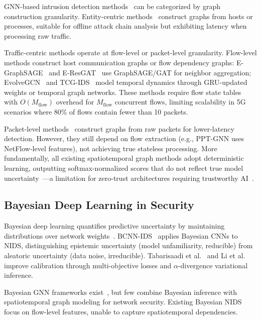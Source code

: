 \documentclass[lettersize,journal]{IEEEtran}
\begin{document}
GNN-based intrusion detection methods~\cite{Zhong_GNN_IDS_Survey_2024} can be categorized by graph construction granularity. Entity-centric methods~\cite{jiang2020gnn,kisanga2023graph,sun2024gnnids} construct graphs from hosts or processes, suitable for offline attack chain analysis but exhibiting latency when processing raw traffic.

Traffic-centric methods operate at flow-level or packet-level granularity. Flow-level methods construct host communication graphs or flow dependency graphs: E-GraphSAGE~\cite{lo2022egraphsage} and E-ResGAT~\cite{E-ResGAT} use GraphSAGE/GAT for neighbor aggregation; EvolveGCN~\cite{EvolveGCN} and TCG-IDS~\cite{TCG-IDS} model temporal dynamics through GRU-updated weights or temporal graph networks. These methods require flow state tables with $O(M_{\text{flow}})$ overhead for $M_{\text{flow}}$ concurrent flows, limiting scalability in 5G scenarios where 80\% of flows contain fewer than 10 packets.

Packet-level methods~\cite{Graph2vec+RF,GTAE-IDS,PPT-GNN} construct graphs from raw packets for lower-latency detection. However, they still depend on flow extraction (e.g., PPT-GNN uses NetFlow-level features), not achieving true stateless processing. More fundamentally, all existing spatiotemporal graph methods adopt deterministic learning, outputting softmax-normalized scores that do not reflect true model uncertainty~\cite{Guo_Calibration_2017}---a limitation for zero-trust architectures requiring trustworthy AI~\cite{NIST-ZTA}.

\subsection{Bayesian Deep Learning in Security}

Bayesian deep learning quantifies predictive uncertainty by maintaining distributions over network weights~\cite{Gal_Uncertainty_2016}. BCNN-IDS~\cite{BCNN-IDS} applies Bayesian CNNs to NIDS, distinguishing epistemic uncertainty (model unfamiliarity, reducible) from aleatoric uncertainty (data noise, irreducible). Tabarisaadi et al.~\cite{Tabarisaadi2024} and Li et al.~\cite{Li2025TrustworthyBayesian} improve calibration through multi-objective losses and $\alpha$-divergence variational inference.

Bayesian GNN frameworks exist~\cite{Zhang2019BGCN,Hasanzadeh2020GDC}, but few combine Bayesian inference with spatiotemporal graph modeling for network security. Existing Bayesian NIDS focus on flow-level features, unable to capture spatiotemporal dependencies.
\end{document}
